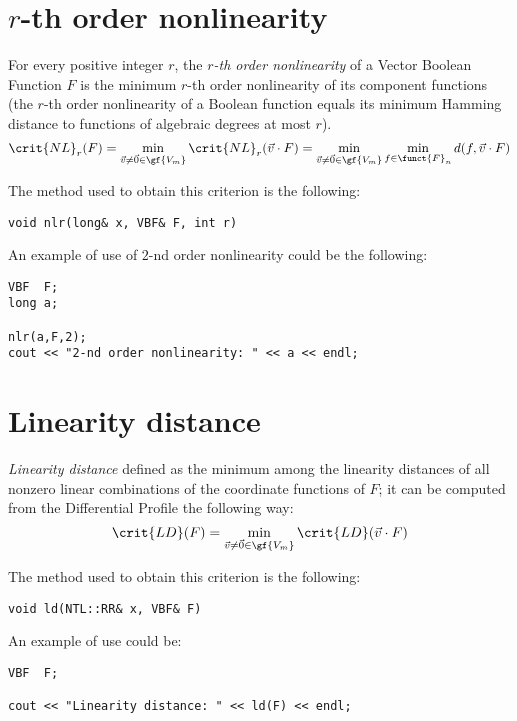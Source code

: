 \section{$r$-th order nonlinearity}

For every positive integer $r$, the \textsl{$r$-th order nonlinearity} of a Vector Boolean Function $F$ is the minimum $r$-th order nonlinearity of its component functions (the $r$-th order nonlinearity of a Boolean function equals its minimum Hamming distance to functions of algebraic degrees at most $r$).
\begin{equation}
\crit{NL}_r(F) = \min_{\vec{v} \neq \vec{0} \in \gf{V_m}} \crit{NL}_r(\vec{v} \cdot
F) = \min_{\vec{v} \neq \vec{0} \in \gf{V_m}} \min_{f \in \funct{F}_n} d(f,\vec{v} \cdot
F) 
\end{equation}

The method used to obtain this criterion is the following:

\begin{verbatim}
void nlr(long& x, VBF& F, int r)
\end{verbatim}

An example of use of $2$-nd order nonlinearity could be the following:

\begin{verbatim}
VBF  F;
long a;

nlr(a,F,2);
cout << "2-nd order nonlinearity: " << a << endl;
\end{verbatim}

\section{Linearity distance}

\textsl{Linearity distance} defined as the minimum among the linearity
  distances of all nonzero linear combinations of the coordinate functions of
  $F$; it can be computed from the Differential Profile the following way: 
\begin{equation}
\crit{LD}(F) = \min_{\vec{v} \neq \vec{0} \in \gf{V_m}} \crit{LD}(\vec{v} \cdot F)
\end{equation}

The method used to obtain this criterion is the following:

\begin{verbatim}
void ld(NTL::RR& x, VBF& F)
\end{verbatim}

An example of use could be:

\begin{verbatim}
VBF  F;

cout << "Linearity distance: " << ld(F) << endl;
\end{verbatim}

